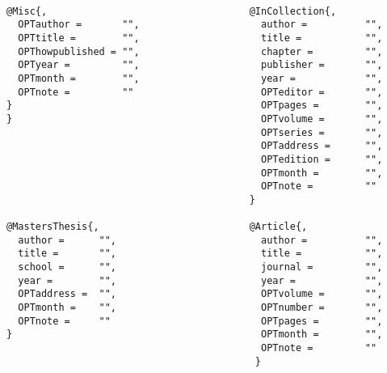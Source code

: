 {\begin{verbatim}
 
@Misc{,                                   @InCollection{,
  OPTauthor =       "",                     author =          "",
  OPTtitle =        "",                     title =           "",
  OPThowpublished = "",                     chapter =         "",
  OPTyear =         "",                     publisher =       "",
  OPTmonth =        "",                     year =            "",
  OPTnote =         ""                      OPTeditor =       "",
}                                           OPTpages =        "",
}                                           OPTvolume =       "",
                                            OPTseries =       "",
                                            OPTaddress =      "",
                                            OPTedition =      "",
                                            OPTmonth =        "",
                                            OPTnote =         ""
                                          }

@MastersThesis{,                          @Article{,
  author =      "",                         author =          "",
  title =       "",                         title =           "",
  school =      "",                         journal =         "",
  year =        "",                         year =            "",
  OPTaddress =  "",                         OPTvolume =       "",
  OPTmonth =    "",                         OPTnumber =       "",
  OPTnote =     ""                          OPTpages =        "",
}                                           OPTmonth =        "",
                                            OPTnote =         ""
                                           }\end{verbatim} }
